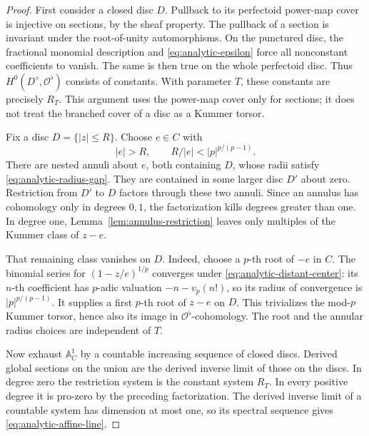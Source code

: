 \begin{proof}
First consider a closed disc \(D\).  Pullback to its perfectoid
power-map cover is injective on sections, by the sheaf property.
The pullback of a section is invariant under the root-of-unity
automorphisms.  On the punctured disc, the fractional monomial
description and \eqref{eq:analytic-epsilon} force all nonconstant
coefficients to vanish.  The same is then true on the whole
perfectoid disc.  Thus \(H^0(D^\diamond,\mathcal O^\flat)\) consists
of constants.  With parameter \(T\), these constants are precisely
\(R_T\).  This argument uses the power-map cover only for sections;
it does not treat the branched cover of a disc as a Kummer torsor.

Fix a disc \(D=\{|z|\leq R\}\).  Choose \(e\in C\) with
\begin{equation}
 |e|>R,\qquad R/|e|<|p|^{p/(p-1)}.
 \label{eq:analytic-distant-center}
\end{equation}
There are nested annuli about \(e\), both containing \(D\), whose
radii satisfy \eqref{eq:analytic-radius-gap}.  They are contained
in some larger disc \(D'\) about zero.  Restriction from \(D'\) to
\(D\) factors through these two annuli.  Since an annulus has
cohomology only in degrees \(0,1\), the factorization kills degrees
greater than one.  In degree one,
Lemma~\ref{lem:annulus-restriction} leaves only multiples of the
Kummer class of \(z-e\).

That remaining class vanishes on \(D\).  Indeed, choose a \(p\)-th
root of \(-e\) in \(C\).  The binomial series for
\((1-z/e)^{1/p}\) converges under
\eqref{eq:analytic-distant-center}: its \(n\)-th coefficient has
\(p\)-adic valuation \(-n-v_p(n!)\), so its radius of convergence is
\(|p|^{p/(p-1)}\).  It supplies a first \(p\)-th root of \(z-e\) on
\(D\).  This trivializes the mod-\(p\) Kummer torsor, hence also its
image in \(\mathcal O^\flat\)-cohomology.  The root and the annular
radius choices are independent of \(T\).

Now exhaust \(\mathbb A^1_C\) by a countable increasing sequence of
closed discs.  Derived global sections on the union are the derived
inverse limit of those on the discs.  In degree zero the restriction
system is the constant system \(R_T\).  In every positive degree it
is pro-zero by the preceding factorization.  The derived inverse
limit of a countable system has dimension at most one, so its
spectral sequence gives \eqref{eq:analytic-affine-line}.
\end{proof}

